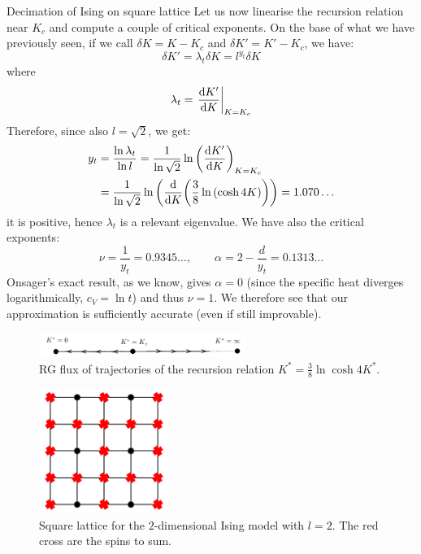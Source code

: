 \documentclass[../main/main.tex]{subfiles}
\begin{document}
\begin{example}{Decimation of Ising on square lattice}{}
Let us now linearise the recursion relation near \( K_c \) and compute a couple of critical exponents.
On the base of what we have previously seen, if we call \( \delta K = K - K_c \) and \( \delta K' = K' - K_c \), we have:
\begin{equation*}
  \delta K' = \lambda _t \delta K = l^{y _t} \delta K
\end{equation*}
where
\begin{equation*}
  \lambda _t = \eval{\dv{K'}{K} }_{K=K_c}
\end{equation*}
Therefore, since also \( l = \sqrt{2}  \), we get:
\begin{equation*}
\begin{split}
y_t  &= \frac{\ln{\lambda _t} }{\ln{l} } = \frac{1}{\ln{\sqrt{2} } } \ln{\qty(\dv{K'}{K})_{K=K_c} }   \\
& = \frac{1}{\ln{\sqrt{2} } }  \ln{\qty(\dv{}{K} \qty(\frac{3}{8} \ln{(\cosh 4K)} ) ) } = 1.070\dots
\end{split}
\end{equation*}
it is positive, hence \( \lambda _t \)  is a relevant eigenvalue.
We have also the critical exponents:
\begin{equation*}
  \nu = \frac{1}{y_t} = 0.9345\dots, \qquad \alpha = 2 - \frac{d}{y_t} = 0.1313\dots
\end{equation*}
Onsager's exact result, as we know, gives \( \alpha =0 \) (since the specific heat diverges logarithmically, \( c_V = \ln t \)) and thus \( \nu =1 \). We therefore see that our approximation is sufficiently accurate (even if still improvable).

\end{example}



\begin{figure}[h!]
\centering
\includegraphics[width=0.6\textwidth]{../lessons/20_image/9.pdf}
\caption{\label{fig:20_8} RG flux of trajectories of the recursion relation \(   K^* = \frac{3}{8} \ln{\cosh 4 K^*} \). }
\end{figure}


\begin{figure}[h!]
\centering
\includegraphics[width=0.37\textwidth]{../lessons/20_image/10.pdf}
\caption{\label{fig:20_9} Square lattice for the \( 2 \)-dimensional Ising model with \( l=2 \). The red cross are the spins to sum.}
\end{figure}
\end{document}
